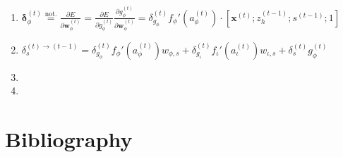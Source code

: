\documentclass[11pt]{article}
\begin{document}
\begin{enumerate}
    \item $\boldsymbol{\delta}_{\phi}^{(t)} \overset{\text{not.}}{=} \displaystyle \frac{\partial E}{\partial \boldsymbol{w}_{\phi}^{(t)}} = \displaystyle \frac{\partial E}{\partial g_{\phi}^{(t)}} \displaystyle \frac{\partial g_{\phi}^{(t)}}{\partial \boldsymbol{w}_{\phi}^{(t)}} = \delta_{g_{\phi}}^{(t)} f_{\phi}'\left(a_{\phi}^{(t)}\right) \cdot \left[\mathbf{x}^{(t)}; z_{h}^{(t-1)}; s^{(t-1)}; 1\right]$
    \item $\delta^{(t) \rightarrow (t-1)}_s = \delta_{g_{\phi}}^{(t)}f_{\phi}'(a_{\phi}^{(t)})w_{\phi, s} +
        \delta_{g_{\iota}}^{(t)}f_{\iota}'(a_{\iota}^{(t)})w_{\iota, s} +
        \delta_{s}^{(t)}g_{\phi}^{(t)}$
    \item
    \item
\end{enumerate}

\appendix
\section{Bibliography}
\end{document}
